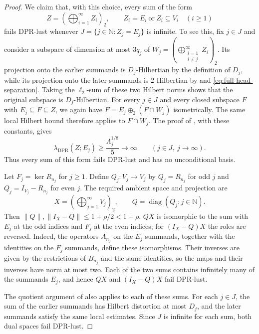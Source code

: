 \documentclass[11pt,a4paper,reqno]{amsart}
\theoremstyle{definition}
\newcommand{\N}{\mathbb N}
\newcommand{\norm}[1]{\lVert #1\rVert}
\DeclareMathOperator{\diag}{diag}
\numberwithin{equation}{section}
\begin{document}
\begin{proof}
We claim that, with this choice, every sum of the form
\begin{equation*}
 Z=\left(\bigoplus_{i=1}^{\infty}Z_i\right)_2,\qquad
 Z_i=E_i\ \text{or}\ Z_i\subseteq V_i\quad(i\geq1)
\end{equation*}
fails DPR-lust whenever $J=\{j\in\N:Z_j=E_j\}$ is infinite. To see this, fix $j\in J$ and consider a subspace of dimension at most $3q_j$ of $W_j=(\bigoplus_{\substack{i=1\\i\ne j}}^{\infty}Z_i)_2$. Its projection onto the earlier summands is $D_j$-Hilbertian by the definition of $D_j$, while its projection onto the later summands is $2$-Hilbertian by  and \eqref{eq:full-head-separation}. Taking the $\ell_2$-sum of these two Hilbert norms shows that the original subspace is $D_j$-Hilbertian. For every $j\in J$ and every closed subspace $F$ with $E_j\subseteq F\subseteq Z$, we again have $F=E_j\oplus_2(F\cap W_j)$ isometrically. The same local Hilbert bound therefore applies to $F\cap W_j$. The proof of , with these constants, gives
\begin{equation*}
 \lambda_{\mathrm{DPR}}(Z;E_j)
 \geq\frac{\Lambda_j^{1/8}}5
 \longrightarrow\infty\qquad(j\in J,\ j\to\infty).
\end{equation*}
Thus every sum of this form fails DPR-lust and has no unconditional basis.

Let $F_j=\ker R_{n_j}$ for $j\geq1$. Define $Q_j\colon V_j\to V_j$ by $Q_j=R_{n_j}$ for odd $j$ and $Q_j=I_{V_j}-R_{n_j}$ for even $j$. The required ambient space and projection are
\begin{equation*}
 X=\left(\bigoplus_{j=1}^{\infty}V_j\right)_2,\qquad
 Q=\diag(Q_j:j\in\N).
\end{equation*}
Then $\norm Q,\norm{I_X-Q}\leq1+\rho/2<1+\rho$. $QX$ is isomorphic to the sum with $E_j$ at the odd indices and $F_j$ at the even indices; for $(I_X-Q)X$ the roles are reversed. Indeed, the operators $A_{n_j}$ on the $E_j$ summands, together with the identities on the $F_j$ summands, define these isomorphisms. Their inverses are given by the restrictions of $B_{n_j}$ and the same identities, so the maps and their inverses have norm at most two. Each of the two sums contains infinitely many of the summands $E_j$, and hence $QX$ and $(I_X-Q)X$ fail DPR-lust.

The quotient argument of  also applies to each of these sums. For each $j\in J$, the sum of the earlier summands has Hilbert distortion at most $D_j$, and the later summands satisfy the same local estimates. Since $J$ is infinite for each sum, both dual spaces fail DPR-lust.


\end{proof}
\end{document}

